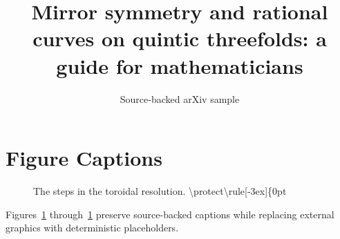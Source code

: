 \documentclass[11pt]{article}
\title{Mirror symmetry and rational curves on quintic threefolds: a guide for
  mathematicians}
\author{Source-backed arXiv sample}
\date{}
\begin{document}
\maketitle
\section{Figure Captions}

\begin{figure}[htbp]
\centering
\fbox{\rule{0pt}{1.15in}\rule{0.78\linewidth}{0pt}}
\caption{The steps in the toroidal resolution. \textbackslash{}protect\textbackslash{}rule[-3ex]\{0pt}
\label{fig:source-1}
\end{figure}


Figures~\ref{fig:source-1} through~\ref{fig:source-1} preserve source-backed captions while replacing external graphics with deterministic placeholders.
\end{document}
